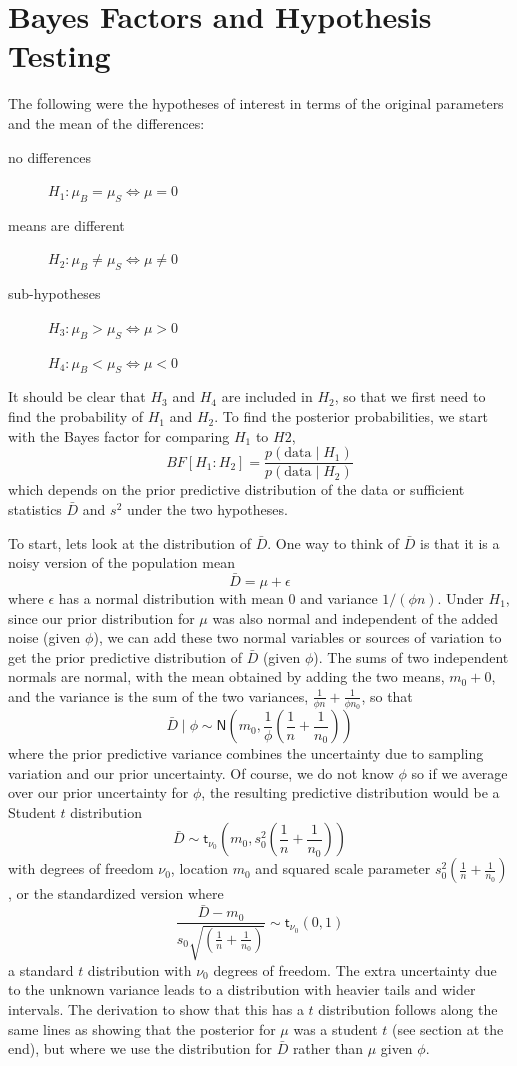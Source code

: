 \documentclass[11pt]{article}
\def\No{\textsf{N}}
\def\BF{\textit{BF}}
\newcommand{\St}{\textsf{t}}
\def\data{\text{data}}
\begin{document}
\section*{Bayes Factors and Hypothesis Testing}

The following were the hypotheses of interest in terms of the original parameters and the mean of the differences:
\begin{description}%
\item [no differences] $H_1:  \mu_B = \mu_S  \Leftrightarrow \mu = 0 $   
\item [means are different] $H_2:  \mu_B \neq \mu_S \Leftrightarrow \mu  \neq 0 $ 
\item [sub-hypotheses]  $H_{3}:  \mu_B > \mu_S \Leftrightarrow \mu  > 0 $ 
\item [ ] $H_{4}:  \mu_B < \mu_S \Leftrightarrow \mu  < 0 $
\end{description}

It should be clear that $H_3$ and $H_4$ are included in $H_2$, so that we first need to find the probability of $H_1$ and $H_2$.    To find the posterior probabilities, we start with the Bayes factor for comparing $H_1$  to $H2$,
$$
\BF[H_1: H_2] = \frac{p(\data \mid H_1)} {p(\data \mid H_2)}
$$
which depends on the prior predictive distribution of the data or sufficient statistics $\bar{D}$ and $s^2$ under the two hypotheses. 

To start, lets look at the distribution of $\bar{D}$.
One way to think of $\bar{D}$ is that it is a noisy version of the population mean
$$\bar{D} = \mu + \epsilon$$
where $\epsilon$ has a normal distribution with mean 0 and variance $1/(\phi n)$.
Under $H_1$, 
since our prior distribution for $\mu$ was also normal and independent of the added noise (given $\phi$), we can add these two normal variables or sources of variation to get the prior predictive distribution of $\bar{D}$ (given $\phi$).  The sums of two independent normals are normal, with the mean obtained by adding the two means, $m_0 + 0$, and the variance is the sum of the two variances, $\frac{1}{\phi n} + \frac{1} {\phi n_0}$, so that
$$
\bar{D} \mid \phi \sim \No\left(m_0, \frac{1}{\phi} \left(\frac 1 n + \frac 1 {n_0}\right) \right)
$$
where the prior predictive variance combines the uncertainty due to sampling variation and our prior uncertainty.  Of course, we do not know $\phi$ so if we average over our prior uncertainty for $\phi$, the resulting predictive distribution would be a Student $t$ distribution
$$
\bar{D} \sim \St_{\nu_0}\left(m_0, s^2_0   \left(\frac 1 n + \frac 1 {n_0}\right)\right)
$$
with degrees of freedom $\nu_0$, location $m_0$ and squared scale parameter 
$s^2_0   \left(\frac 1 n + \frac 1 {n_0}\right)$, or the standardized version where
$$
\frac{\bar{D} - m_0} {s_0   \sqrt{\left(\frac 1 n + \frac 1 {n_0}\right)}} \sim \St_{\nu_0}(0,1)
$$
a standard $t$ distribution with $\nu_0$ degrees of freedom.  The extra uncertainty due to the unknown variance leads to a distribution with heavier tails and wider intervals.  The derivation to show that this has a $t$ distribution  follows along the same lines as showing that the posterior for $\mu$ was a student $t$  (see section at the end), but where we use the distribution for $\bar{D}$  rather than $\mu$ given $\phi$.
\end{document}
